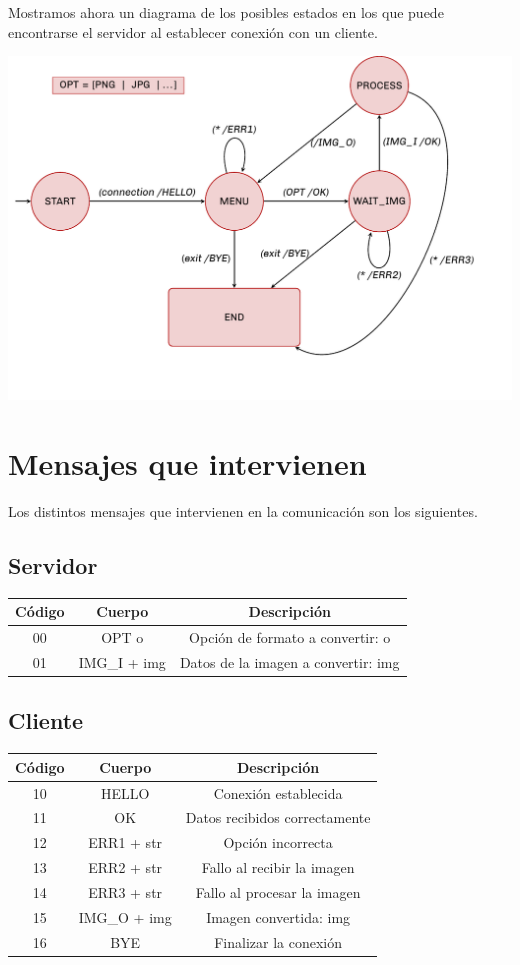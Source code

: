 \documentclass[11pt]{article}
\begin{document}
Mostramos ahora un diagrama de los posibles estados en los que puede encontrarse el servidor al establecer conexión con un cliente.
\begin{center}
	\includegraphics[width=.9\textwidth]{img/diagrama}
\end{center}	


\section{Mensajes que intervienen}

Los distintos mensajes que intervienen en la comunicación son los siguientes.

\subsection{Servidor}
\begin{center}
	\begin{tabular}{|c|c|c|}
	\hline
	Código & Cuerpo & Descripción\\
	\hline
	00 & OPT o & Opción de formato a convertir: o\\
	\hline
	01 & IMG\_I + img & Datos de la imagen a convertir: img\\
	\hline
\end{tabular}
\end{center}


\subsection{Cliente}
\begin{center}
	\begin{tabular}{|c|c|c|}
	\hline
	Código & Cuerpo & Descripción\\
	\hline
	10 & HELLO & Conexión establecida\\
	\hline
	11 & OK & Datos recibidos correctamente\\
	\hline
	12 & ERR1 + str & Opción incorrecta\\
	\hline
	13 & ERR2 + str & Fallo al recibir la imagen\\
	\hline
	14 & ERR3 + str & Fallo al procesar la imagen\\
	\hline
	15 & IMG\_O + img & Imagen convertida: img\\
	\hline
	16 & BYE & Finalizar la conexión\\
	\hline 
\end{tabular}	
\end{center}
\end{document}
